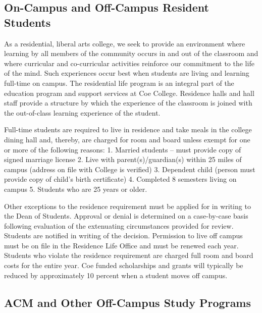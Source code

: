 \documentclass[
  letterpaper,
]{scrbook}
\begin{document}
\hypertarget{on-campus-and-off-campus-resident-students}{%
\subsection{On-Campus and Off-Campus Resident
Students}\label{on-campus-and-off-campus-resident-students}}

As a residential, liberal arts college, we seek to provide an
environment where learning by all members of the community occurs in and
out of the classroom and where curricular and co-curricular activities
reinforce our commitment to the life of the mind. Such experiences occur
best when students are living and learning full-time on campus. The
residential life program is an integral part of the education program
and support services at Coe College. Residence halls and hall staff
provide a structure by which the experience of the classroom is joined
with the out-of-class learning experience of the student.

Full-time students are required to live in residence and take meals in
the college dining hall and, thereby, are charged for room and board
unless exempt for one or more of the following reasons: 1. Married
students -- must provide copy of signed marriage license 2. Live with
parent(s)/guardian(s) within 25 miles of campus (address on file with
College is verified) 3. Dependent child (person must provide copy of
child's birth certificate) 4. Completed 8 semesters living on campus 5.
Students who are 25 years or older.

Other exceptions to the residence requirement must be applied for in
writing to the Dean of Students. Approval or denial is determined on a
case-by-case basis following evaluation of the extenuating circumstances
provided for review. Students are notified in writing of the decision.
Permission to live off campus must be on file in the Residence Life
Office and must be renewed each year. Students who violate the residence
requirement are charged full room and board costs for the entire year.
Coe funded scholarships and grants will typically be reduced by
approximately 10 percent when a student moves off campus.

\hypertarget{acm-and-other-off-campus-study-programs}{%
\subsection{ACM and Other Off-Campus Study
Programs}\label{acm-and-other-off-campus-study-programs}}
\end{document}
